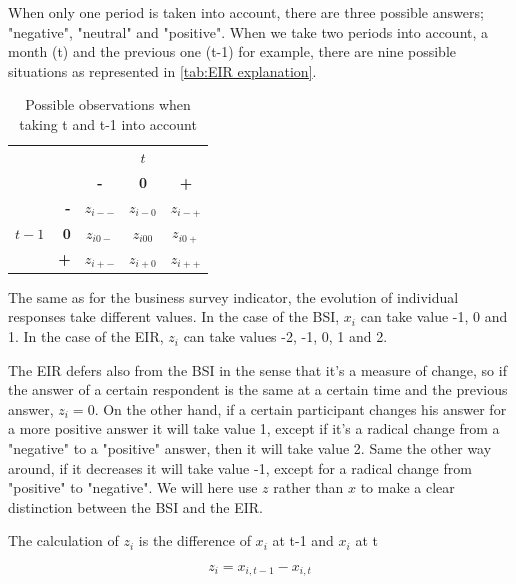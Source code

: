 \documentclass[12pt,a4paper,oneside]{book}
\begin{document}
When only one period is taken into account, there are three possible answers; "negative", "neutral" and "positive".
When we take two periods into account, a month (t) and the previous one (t-1) for example, there are nine possible situations as represented in \autoref{tab:EIR explanation}. 


\begin{table}[htp!]
     \centering \footnotesize
    \begin{tabular}{r | r | c c c | }
    \multicolumn{1}{r}{} & \multicolumn{1}{r}{} &    \multicolumn{3}{c}{$t$} \\ \cline{3-5}
    \multicolumn{1}{r}{} &         & \textbf{-} & \textbf{0} & \textbf{+} \\ \cline{2-5}
          &    \textbf{-} & $z_{i--}$    & $z_{i-0}$    & $z_{i-+}$ \\ 
    $t-1$ & \textbf{0}  & $z_{i0-}$    & $z_{i00}$    & $z_{i0+}$ \\
          &    \textbf{+} & $z_{i+-}$    & $z_{i+0}$    & $z_{i++}$ \\ \cline{2-5}
    \end{tabular}
    \caption{Possible observations when taking t and t-1 into account}
    \label{tab:EIR explanation}
\end{table}

The same as for the business survey indicator, the evolution of individual responses take different values. In the case of the BSI, $x_i$ can take value -1, 0 and 1. In the case of the EIR, $z_i$ can take values -2, -1, 0, 1 and 2.

The EIR defers also from the BSI in the sense that it's a measure of change, so if the answer of a certain respondent is the same at a certain time and the previous answer, $z_i=0$. 
On the other hand, if a certain participant changes his answer for a more positive answer it will take value 1, except if it's a radical change from a "negative" to a "positive" answer, then it will take value 2.
Same the other way around, if it decreases it will take value -1, except for a radical change from "positive" to "negative".
We will here use $z$ rather than $x$ to make a clear distinction between the BSI and the EIR.

The calculation of $z_i$ is the difference of $x_i$ at t-1 and $x_i$ at t

\begin{equation}
    z_i = x_{i,t-1} - x_{i,t}
\end{equation}
\end{document}
